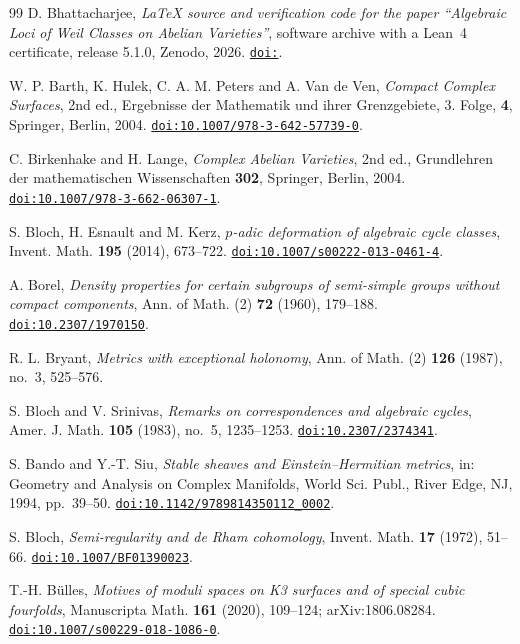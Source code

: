 \begin{thebibliography}{99}
D. Bhattacharjee,
\emph{LaTeX source and verification code for the paper ``Algebraic Loci of
Weil Classes on Abelian Varieties''}, software archive with a Lean~4
certificate, release 5.1.0, Zenodo, 2026.
\href{https://doi.org/\zenodoCodeID}{\texttt{doi:\zenodoCodeID}}.

W. P. Barth, K. Hulek, C. A. M. Peters and A. Van de Ven,
\emph{Compact Complex Surfaces}, 2nd ed.,
Ergebnisse der Mathematik und ihrer Grenzgebiete, 3. Folge, \textbf{4},
Springer, Berlin, 2004.
\href{https://doi.org/10.1007/978-3-642-57739-0}{\texttt{doi:10.1007/978-3-642-57739-0}}.

C. Birkenhake and H. Lange,
\emph{Complex Abelian Varieties}, 2nd ed.,
Grundlehren der mathematischen Wissenschaften \textbf{302},
Springer, Berlin, 2004.
\href{https://doi.org/10.1007/978-3-662-06307-1}{\texttt{doi:10.1007/978-3-662-06307-1}}.

S. Bloch, H. Esnault and M. Kerz,
\emph{$p$-adic deformation of algebraic cycle classes},
Invent. Math. \textbf{195} (2014), 673--722.
\href{https://doi.org/10.1007/s00222-013-0461-4}{\texttt{doi:10.1007/s00222-013-0461-4}}.

A. Borel,
\emph{Density properties for certain subgroups of semi-simple groups without
compact components},
Ann. of Math. (2) \textbf{72} (1960), 179--188.
\href{https://doi.org/10.2307/1970150}{\texttt{doi:10.2307/1970150}}.

R. L. Bryant,
\emph{Metrics with exceptional holonomy},
Ann. of Math. (2) \textbf{126} (1987), no.~3, 525--576.

S. Bloch and V. Srinivas,
\emph{Remarks on correspondences and algebraic cycles},
Amer. J. Math. \textbf{105} (1983), no.~5, 1235--1253.
\href{https://doi.org/10.2307/2374341}{\texttt{doi:10.2307/2374341}}.

S. Bando and Y.-T. Siu,
\emph{Stable sheaves and Einstein--Hermitian metrics},
in: Geometry and Analysis on Complex Manifolds,
World Sci. Publ., River Edge, NJ, 1994, pp.~39--50.
\href{https://doi.org/10.1142/9789814350112_0002}{\texttt{doi:10.1142/9789814350112\_0002}}.

S. Bloch,
\emph{Semi-regularity and de Rham cohomology},
Invent. Math. \textbf{17} (1972), 51--66.
\href{https://doi.org/10.1007/BF01390023}{\texttt{doi:10.1007/BF01390023}}.

T.-H. B\"ulles,
\emph{Motives of moduli spaces on K3 surfaces and of special cubic
fourfolds},
Manuscripta Math. \textbf{161} (2020), 109--124; arXiv:1806.08284.
\href{https://doi.org/10.1007/s00229-018-1086-0}{\texttt{doi:10.1007/s00229-018-1086-0}}.


\end{thebibliography}
